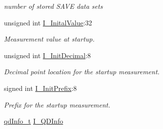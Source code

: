 \begin{DoxyCompactItemize}
\begin{DoxyCompactList}\small\item\em number of stored SAVE data sets \item\end{DoxyCompactList}\item 
\hypertarget{structFluke_1_1Fluke189_1_1cmdr__QD2__t_aa468131437b1fd35ea5149032e1f4528}{
unsigned int \hyperlink{structFluke_1_1Fluke189_1_1cmdr__QD2__t_aa468131437b1fd35ea5149032e1f4528}{I\_\-InitalValue}:32}
\label{structFluke_1_1Fluke189_1_1cmdr__QD2__t_aa468131437b1fd35ea5149032e1f4528}

\begin{DoxyCompactList}\small\item\em Measurement value at startup. \item\end{DoxyCompactList}\item 
\hypertarget{structFluke_1_1Fluke189_1_1cmdr__QD2__t_a2674fd1dfe9ef48b786bf836083672b1}{
unsigned int \hyperlink{structFluke_1_1Fluke189_1_1cmdr__QD2__t_a2674fd1dfe9ef48b786bf836083672b1}{I\_\-InitDecimal}:8}
\label{structFluke_1_1Fluke189_1_1cmdr__QD2__t_a2674fd1dfe9ef48b786bf836083672b1}

\begin{DoxyCompactList}\small\item\em Decimal point location for the startup measurement. \item\end{DoxyCompactList}\item 
\hypertarget{structFluke_1_1Fluke189_1_1cmdr__QD2__t_a8599e4751cc1b4cdde359042450e3075}{
signed int \hyperlink{structFluke_1_1Fluke189_1_1cmdr__QD2__t_a8599e4751cc1b4cdde359042450e3075}{I\_\-InitPrefix}:8}
\label{structFluke_1_1Fluke189_1_1cmdr__QD2__t_a8599e4751cc1b4cdde359042450e3075}

\begin{DoxyCompactList}\small\item\em Prefix for the startup measurement. \item\end{DoxyCompactList}\item 
\hypertarget{structFluke_1_1Fluke189_1_1cmdr__QD2__t_a924ed3179306859794c6544fe9848f00}{
\hyperlink{structFluke_1_1Fluke189_1_1qdInfo__t}{qdInfo\_\-t} \hyperlink{structFluke_1_1Fluke189_1_1cmdr__QD2__t_a924ed3179306859794c6544fe9848f00}{I\_\-QDInfo}}
\label{structFluke_1_1Fluke189_1_1cmdr__QD2__t_a924ed3179306859794c6544fe9848f00}


\end{DoxyCompactItemize}

